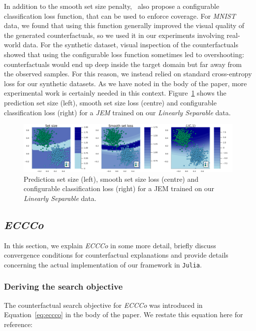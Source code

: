 In addition to the smooth set size penalty,~\citet{stutz2022learning} also propose a configurable classification loss function, that can be used to enforce coverage. For \textit{MNIST} data, we found that using this function generally improved the visual quality of the generated counterfactuals, so we used it in our experiments involving real-world data. For the synthetic dataset, visual inspection of the counterfactuals showed that using the configurable loss function sometimes led to overshooting: counterfactuals would end up deep inside the target domain but far away from the observed samples. For this reason, we instead relied on standard cross-entropy loss for our synthetic datasets. As we have noted in the body of the paper, more experimental work is certainly needed in this context. Figure~\ref{fig:cp-diff} shows the prediction set size (left), smooth set size loss (centre) and configurable classification loss (right) for a \textit{JEM} trained on our \textit{Linearly Separable} data.

\begin{figure}
  \centering
  \includegraphics[width=1.0\linewidth]{../www/poc_set_size.png}
  \caption{Prediction set size (left), smooth set size loss (centre) and configurable classification loss (right) for a JEM trained on our \textit{Linearly Separable} data.}\label{fig:cp-diff}
\end{figure}

\subsection{\textit{ECCCo}}\label{app:eccco}

In this section, we explain \textit{ECCCo} in some more detail, briefly discuss convergence conditions for counterfactual explanations and provide details concerning the actual implementation of our framework in \texttt{Julia}.  

\subsubsection{Deriving the search objective} 

The counterfactual search objective for \textit{ECCCo} was introduced in Equation~\ref{eq:eccco} in the body of the paper. We restate this equation here for reference:

